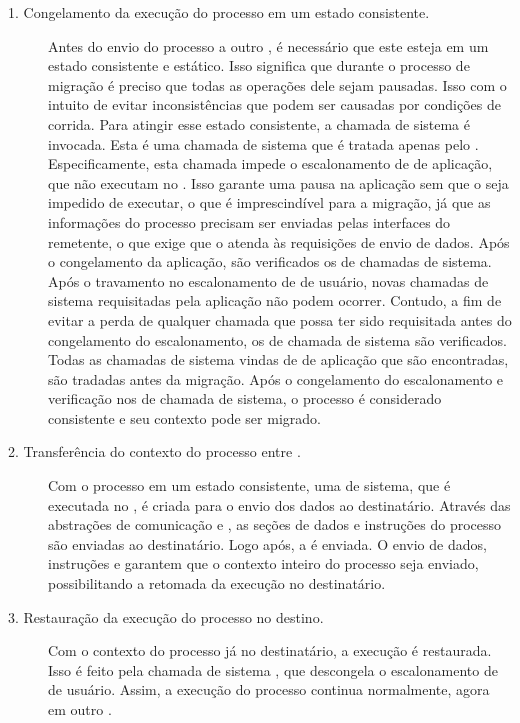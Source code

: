 \begin{description}
	\item[1. Congelamento da execução do processo em um estado consistente.] \hfill
	
	Antes do envio do processo a outro \cluster, é necessário que este esteja em um estado consistente e estático. Isso significa que durante o processo de migração é preciso que todas as operações dele sejam pausadas. Isso com o intuito de evitar inconsistências que podem ser causadas por condições de corrida. Para atingir esse estado consistente, a chamada de sistema \freeze é invocada. Esta é uma chamada de sistema que é tratada apenas pelo \mcore. Especificamente, esta chamada impede o escalonamento de \threads de aplicação, \ie \threads que não executam no \mcore. Isso garante uma pausa na aplicação sem que o \so seja impedido de executar, o que é imprescindível para a migração, já que as informações do processo precisam ser enviadas pelas interfaces \noc do \cluster remetente, o que exige que o \so atenda às requisições de envio de dados. Após o congelamento da aplicação, são verificados os \buffers de chamadas de sistema. Após o travamento no escalonamento de \threads de usuário, novas chamadas de sistema requisitadas pela aplicação não podem ocorrer. Contudo, a fim de evitar a perda de qualquer chamada que possa ter sido requisitada antes do congelamento do escalonamento, os \buffers de chamada de sistema são verificados. Todas as chamadas de sistema vindas de \threads de aplicação que são encontradas, são tradadas antes da migração. Após o congelamento do escalonamento e verificação nos \buffers de chamada de sistema, o processo é considerado consistente e seu contexto pode ser migrado.

	\item[2. Transferência do contexto do processo entre \clusters.] \hfill
	
	Com o processo em um estado consistente, uma \task de sistema, que é executada no \mcore, é criada para o envio dos dados ao \cluster destinatário. Através das abstrações de comunicação \mailbox e \portal, as seções de dados e instruções do processo são enviadas ao \cluster destinatário. Logo após, a \uarea é enviada. O envio de dados, instruções e \uarea garantem que o contexto inteiro do processo seja enviado, possibilitando a retomada da execução no \cluster destinatário.

	\item[3. Restauração da execução do processo no \cluster destino.] \hfill
	
	Com o contexto do processo já no \cluster destinatário, a execução é restaurada. Isso é feito pela chamada de sistema \unfreeze, que descongela o escalonamento de \threads de usuário. Assim, a execução do processo continua normalmente, agora em outro \cluster.
\end{description}